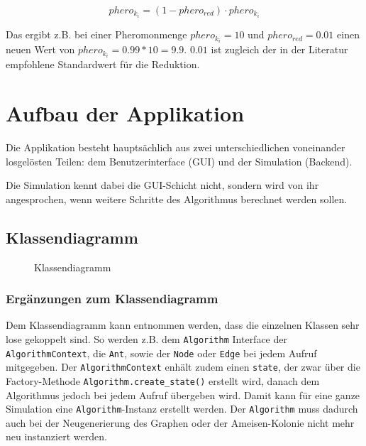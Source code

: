 \[ phero_{k_i} = (1 - phero_{red}) \cdot phero_{k_i} \]

Das ergibt z.B. bei einer Pheromonmenge $phero_{k_i} = 10$ und $phero_{red} = 0.01$ einen neuen Wert von $phero_{k_i} = 0.99 * 10 = 9.9$. $0.01$ ist zugleich der in der Literatur empfohlene Standardwert für die Reduktion.

\section{Aufbau der Applikation}

Die Applikation besteht hauptsächlich aus zwei unterschiedlichen voneinander losgelösten Teilen: dem Benutzerinterface (GUI) und der Simulation (Backend).

Die Simulation kennt dabei die GUI-Schicht nicht, sondern wird von ihr angesprochen, wenn weitere Schritte des Algorithmus berechnet werden sollen.

\pagebreak
\subsection{Klassendiagramm}

\begin{figure}[h]
    \centering
    \caption{Klassendiagramm}
\end{figure}

\pagebreak
\subsubsection*{Ergänzungen zum Klassendiagramm}

Dem Klassendiagramm kann entnommen werden, dass die einzelnen Klassen sehr lose gekoppelt sind. So werden z.B. dem \texttt{Algorithm} Interface der \texttt{AlgorithmContext}, die \texttt{Ant}, sowie der \texttt{Node} oder \texttt{Edge} bei jedem Aufruf mitgegeben. Der \texttt{AlgorithmContext} enhält zudem einen \texttt{state}, der zwar über die Factory-Methode \texttt{Algorithm.create\_state()} erstellt wird, danach dem Algorithmus jedoch bei jedem Aufruf übergeben wird. Damit kann für eine ganze Simulation eine \texttt{Algorithm}-Instanz erstellt werden. Der \texttt{Algorithm} muss dadurch auch bei der Neugenerierung des Graphen oder der Ameisen-Kolonie nicht mehr neu instanziert werden.


